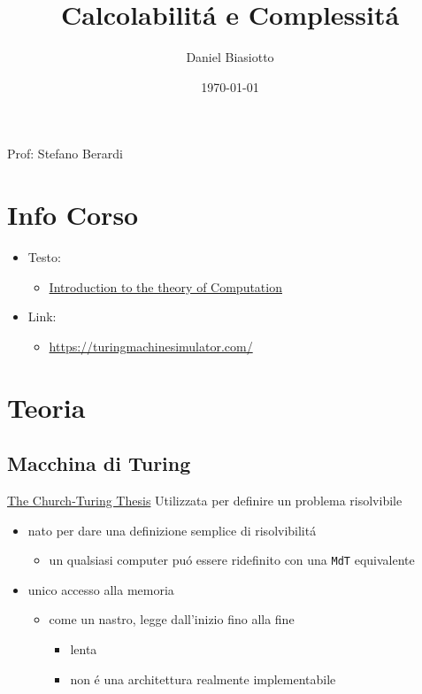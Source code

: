 \documentclass[11pt]{article}
\author{Daniel Biasiotto}
\date{\today}
\title{Calcolabilitá e Complessitá}
\begin{document}
\maketitle
\tableofcontents

Prof: Stefano Berardi
\section{Info Corso}
\label{sec:orgd2cbae7}
\begin{itemize}
\item Testo:
\begin{itemize}
\item \href{20210921121359-introduction_to_the_theory_of_computation.org}{Introduction to the theory of Computation}
\end{itemize}
\item Link:
\begin{itemize}
\item \url{https://turingmachinesimulator.com/}
\end{itemize}
\end{itemize}
\section{Teoria}
\label{sec:org99b7368}
\subsection{Macchina di Turing}
\label{sec:orgf61da94}
\uline{The Church-Turing Thesis}
Utilizzata per definire un problema risolvibile
\begin{itemize}
\item nato per dare una definizione semplice di risolvibilitá
\begin{itemize}
\item un qualsiasi computer puó essere ridefinito con una \texttt{MdT} equivalente
\end{itemize}
\item unico accesso alla memoria
\begin{itemize}
\item come un nastro, legge dall'inizio fino alla fine
\begin{itemize}
\item lenta
\item non é una architettura realmente implementabile
\end{itemize}
\end{itemize}
\end{itemize}
\end{document}
